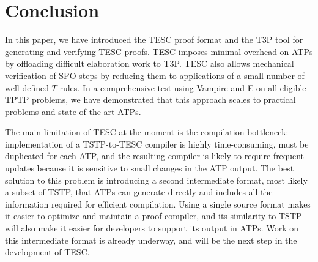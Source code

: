 \documentclass[12pt]{article}
\begin{document}
\section{Conclusion}  \label{sec:conclusion}

In this paper, we have introduced the TESC proof format and the T3P tool for generating and verifying TESC proofs. 
TESC imposes minimal overhead on ATPs by offloading difficult elaboration work to T3P. 
TESC also allows mechanical verification of SPO steps by reducing them to applications of a small number of well-defined $T$ rules.
In a comprehensive test using Vampire and E on all eligible TPTP problems, we have  
demonstrated that this approach scales to practical problems and state-of-the-art ATPs.

The main limitation of TESC at the moment is the compilation bottleneck: implementation of 
a TSTP-to-TESC compiler is highly time-consuming, must be duplicated for each ATP, and the resulting compiler is 
likely to require frequent updates because it is sensitive to small changes in the ATP output.
The best solution to this problem is introducing a second intermediate format, most likely a subset of TSTP, 
that ATPs can generate directly and includes all the information
required for efficient compilation. Using a single source format makes it easier to 
optimize and maintain a proof compiler, and its similarity to TSTP will also make it 
easier for developers to support its output in ATPs.
Work on this intermediate format is already underway, and will be the next 
step in the development of TESC.


% 
% 
\end{document}
